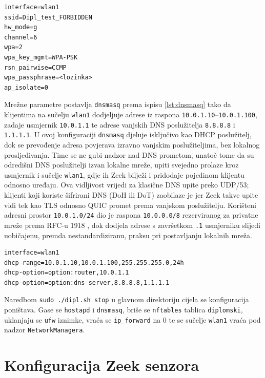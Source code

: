 \begin{lstlisting}[caption={Bitne postavke \texttt{hostapd} konfiguracije}, label={lst:hostapd}]
interface=wlan1
ssid=Dipl_test_FORBIDDEN
hw_mode=g
channel=6
wpa=2
wpa_key_mgmt=WPA-PSK
rsn_pairwise=CCMP
wpa_passphrase=<lozinka>
ap_isolate=0
\end{lstlisting}

Mrežne parametre postavlja \texttt{dnsmasq} \cite{dnsmasq_docs} prema ispisu \ref{lst:dnsmasq} tako da klijentima na sučelju \texttt{wlan1} dodjeljuje adrese iz raspona
\texttt{10.0.1.10}--\texttt{10.0.1.100}, zadaje usmjernik \texttt{10.0.1.1} te adrese vanjskih DNS poslužitelja \texttt{8.8.8.8} i \texttt{1.1.1.1}. U ovoj konfiguraciji
\texttt{dnsmasq} djeluje isključivo kao DHCP poslužitelj, dok se prevođenje adresa povjerava izravno vanjskim poslužiteljima, bez lokalnog prosljeđivanja. Time se ne gubi
nadzor nad DNS prometom, unatoč tome da su odredišni DNS poslužitelji izvan lokalne mreže, upiti svejedno prolaze kroz usmjernik i sučelje \texttt{wlan1}, gdje ih Zeek bilježi i pridodaje
pojedinom klijentu odnosno uređaju. Ova vidljivost vrijedi za klasične DNS upite preko UDP/53; klijenti koji koriste šifrirani DNS (DoH ili DoT) zaobilaze je jer Zeek takve upite vidi tek 
kao TLS odnosno QUIC promet prema vanjskom poslužitelju. Korišteni adresni prostor \texttt{10.0.1.0/24} dio je raspona \texttt{10.0.0.0/8} rezerviranog za privatne mreže prema RFC-u 1918 \cite{rfc1918}, 
dok dodjela adrese s završetkom \texttt{.1} usmjerniku slijedi uobičajenu, premda nestandardiziranu, praksu pri postavljanju lokalnih mreža.

\begin{lstlisting}[caption={Postavke DHCP-a i DNS prosljeđivanja u \texttt{dnsmasq}}, label={lst:dnsmasq}]
interface=wlan1
dhcp-range=10.0.1.10,10.0.1.100,255.255.255.0,24h
dhcp-option=option:router,10.0.1.1
dhcp-option=option:dns-server,8.8.8.8,1.1.1.1
\end{lstlisting}

Naredbom \texttt{sudo ./dipl.sh stop} u glavnom direktoriju cijela se konfiguracija poništava. Gase se \texttt{hostapd} i \texttt{dnsmasq}, briše se \texttt{nftables} tablica \texttt{diplomski},
uklanjaju se \texttt{ufw} iznimke, vraća se \texttt{ip\_forward} na 0 te se sučelje \texttt{wlan1} vraća pod nadzor \texttt{NetworkManagera}.

\section{Konfiguracija Zeek senzora}

